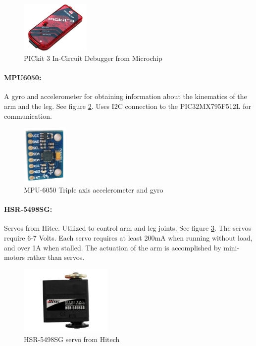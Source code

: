 \documentclass[letterpaper,12pt]{article}
\begin{document}
\begin{figure}
  \centering
    \includegraphics[width=0.3\textwidth]{figures/pickit3.jpg}
  \caption{PICkit 3 In-Circuit Debugger from Microchip}
  \label{pickit3fig}
\end{figure}

\paragraph{MPU6050:}A gyro and accelerometer for obtaining information about the
kinematics of the arm and the leg. See figure \ref{mpufig}. Uses I2C connection
to the PIC32MX795F512L for communication\cite{mpu6050data}.

\begin{figure}
  \centering
    \includegraphics[width=0.2\textwidth]{figures/mpu-6050.jpg}
  \caption{MPU-6050 Triple axis accelerometer and gyro}
  \label{mpufig}
\end{figure}

\paragraph{HSR-5498SG:}Servos from Hitec. Utilized to control arm and leg
joints. See figure \ref{hsrfig}. The servos require 6-7 Volts. Each servo
requires at least 200mA when running without load, and over 1A when stalled.
The actuation of the arm is accomplished by mini-motors rather than
servos\cite{sscdata}.

\begin{figure}
  \centering
    \includegraphics[width=0.4\textwidth]{figures/191_1_HSR-5498SG_HMI_Premium_Robot_Servo-1.jpg}
  \caption{HSR-5498SG servo from Hitech}
  \label{hsrfig}
\end{figure}
\end{document}
